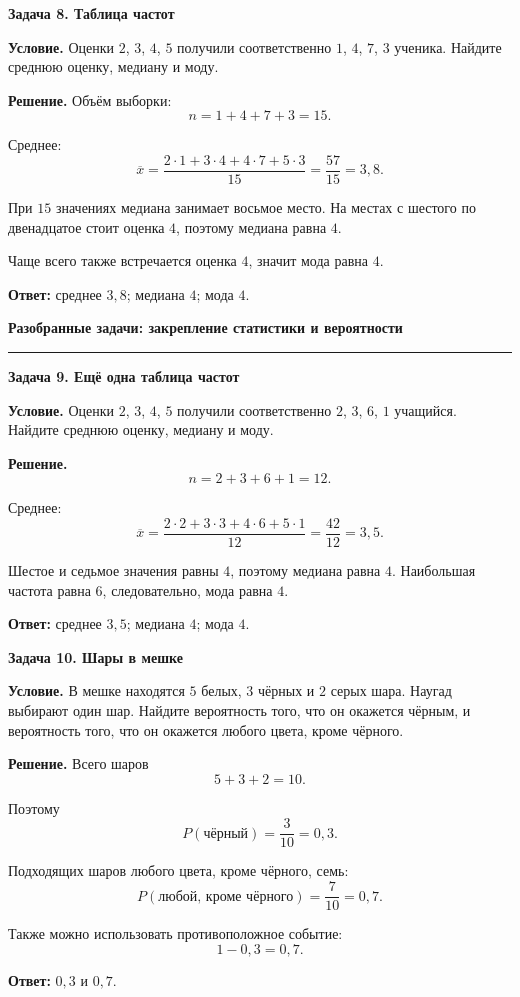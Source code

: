 \documentclass[a4paper,12pt]{article}
\newcommand{\Section}[1]{%
  \Needspace{5\baselineskip}%
  \vspace{0.6em}%
  {\Large\bfseries\color{darkaccent}#1}\par
  \vspace{0.2em}%
  {\color{accent}\rule{0.14\linewidth}{1.2pt}}\par
  \vspace{0.4em}%
}
\newcommand{\Subsection}[1]{%
  \Needspace{3\baselineskip}%
  \vspace{0.45em}%
  {\large\bfseries\color{darkaccent}#1}\par
  \vspace{0.15em}%
}
\newcommand{\Key}[1]{\textbf{\color{darkaccent}#1}}
\begin{document}
\newpage
\Subsection{Задача 8. Таблица частот}

\Key{Условие.}
Оценки $2$, $3$, $4$, $5$ получили соответственно
$1$, $4$, $7$, $3$ ученика.
Найдите среднюю оценку, медиану и моду.

\Key{Решение.}
Объём выборки:
\[
  n=1+4+7+3=15.
\]

Среднее:
\[
  \overline{x}
  =
  \frac{2\cdot1+3\cdot4+4\cdot7+5\cdot3}{15}
  =
  \frac{57}{15}
  =
  3{,}8.
\]

При $15$ значениях медиана занимает восьмое место.
На местах с шестого по двенадцатое стоит оценка $4$,
поэтому медиана равна $4$.

Чаще всего также встречается оценка $4$, значит мода равна $4$.

\Key{Ответ:}
среднее $3{,}8$; медиана $4$; мода $4$.

\clearpage

\Section{Разобранные задачи: закрепление статистики и вероятности}

\Subsection{Задача 9. Ещё одна таблица частот}

\Key{Условие.}
Оценки $2$, $3$, $4$, $5$ получили соответственно
$2$, $3$, $6$, $1$ учащийся.
Найдите среднюю оценку, медиану и моду.

\Key{Решение.}
\[
  n=2+3+6+1=12.
\]

Среднее:
\[
  \overline{x}
  =
  \frac{2\cdot2+3\cdot3+4\cdot6+5\cdot1}{12}
  =
  \frac{42}{12}
  =
  3{,}5.
\]

Шестое и седьмое значения равны $4$, поэтому медиана равна $4$.
Наибольшая частота равна $6$, следовательно, мода равна $4$.

\Key{Ответ:}
среднее $3{,}5$; медиана $4$; мода $4$.

\Subsection{Задача 10. Шары в мешке}

\Key{Условие.}
В мешке находятся $5$ белых, $3$ чёрных и $2$ серых шара.
Наугад выбирают один шар.
Найдите вероятность того, что он окажется чёрным,
и вероятность того, что он окажется любого цвета, кроме чёрного.

\Key{Решение.}
Всего шаров
\[
  5+3+2=10.
\]

Поэтому
\[
  P(\text{чёрный})
  =
  \frac{3}{10}
  =
  0{,}3.
\]

Подходящих шаров любого цвета, кроме чёрного, семь:
\[
  P(\text{любой, кроме чёрного})
  =
  \frac{7}{10}
  =
  0{,}7.
\]

Также можно использовать противоположное событие:
\[
  1-0{,}3=0{,}7.
\]

\Key{Ответ:} $0{,}3$ и $0{,}7$.
\end{document}
